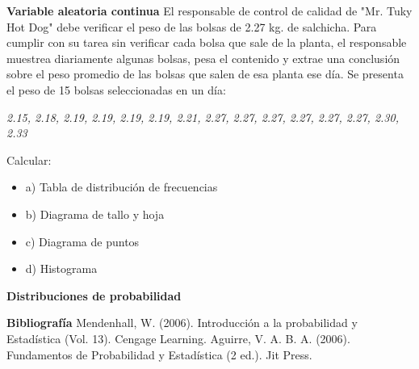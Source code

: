 \documentclass{../oxmathproblems}
\begin{document}
\begin{questions}
\miquestion \textbf{Variable aleatoria continua}
El responsable de control de calidad de "Mr. Tuky Hot Dog" debe verificar el peso de las bolsas de 2.27 kg. de salchicha. Para cumplir con su tarea sin verificar cada bolsa que sale de la planta, el responsable muestrea diariamente algunas bolsas, pesa el contenido y extrae una conclusión sobre el peso promedio de las bolsas que salen de esa planta ese día. Se presenta el peso de 15 bolsas seleccionadas en un día: 

\textit{2.15, 2.18, 2.19, 2.19, 2.19, 2.19, 2.21, 2.27, 2.27, 2.27, 2.27, 2.27, 2.27, 2.30, 2.33}

Calcular: 
\begin{itemize}
\item a) Tabla de distribución de frecuencias
\item b) Diagrama de tallo y hoja
\item c) Diagrama de puntos 
\item d) Histograma 
\end{itemize}




\textbf{Distribuciones de probabilidad} 





\end{questions}




\textbf{Bibliografía}
Mendenhall, W. (2006). Introducción a la probabilidad y Estadística (Vol. 13). Cengage Learning.
Aguirre, V. A. B. A. (2006). Fundamentos de Probabilidad y Estadística (2 ed.). Jit Press.
\end{document}
